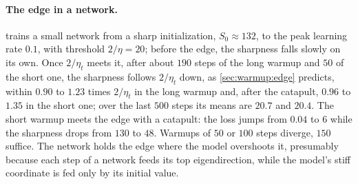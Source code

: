 \begin{refsection}
\paragraph{The edge in a network.}  trains a small network from a sharp initialization, $S_0\approx132$, to the peak learning rate $0.1$, with threshold $2/\eta=20$; before the edge, the sharpness falls slowly on its own. Once $2/\eta_t$ meets it, after about $190$ steps of the long warmup and $50$ of the short one, the sharpness follows $2/\eta_t$ down, as \cref{sec:warmup:edge} predicts, within $0.90$ to $1.23$ times $2/\eta_t$ in the long warmup and, after the catapult, $0.96$ to $1.35$ in the short one; over the last $500$ steps its means are $20.7$ and $20.4$. The short warmup meets the edge with a catapult: the loss jumps from $0.04$ to $6$ while the sharpness drops from $130$ to $48$. Warmups of $50$ or $100$ steps diverge, $150$ suffice. The network holds the edge where the model overshoots it, presumably because each step of a network feeds its top eigendirection, while the model's stiff coordinate is fed only by its initial value.


\end{refsection}
